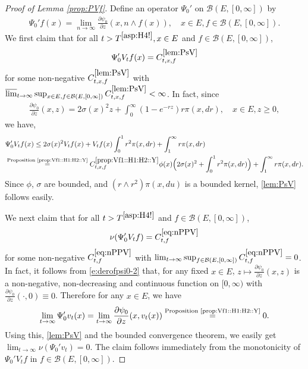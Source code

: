\documentclass[12pt,a4paper]{amsart}
\numberwithin{equation}{section}
\theoremstyle{plain}
\theoremstyle{definition}
\theoremstyle{remark}
\begin{document}
\begin{proof}[Proof of Lemma \ref{prop:PVf}]
	Define an operator $\Psi_0'$ on $\mathcal B(E,[0,\infty])$ by
	\begin{align}
	\Psi_0' f(x)
	= \lim_{n\to \infty}\frac{\partial \psi_0}{ \partial z} (x, n\wedge f(x)),
	\quad x\in E, f\in \mathcal B(E,[0,\infty]).
	\end{align}
	We first claim that for all $t> T^{\eqref{asp:H4!}}, x\in E$ and $f\in \mathcal B(E,[0,\infty])$,
\begin{equation}
	\Psi_0'V_tf(x) = C^{\eqref{lem:PsV}}_{t,x,f} \label{lem:PsV}
\end{equation}
	for some non-negative $C^{\eqref{lem:PsV}}_{t,x,f}$ with $\varlimsup_{t\to \infty} \sup_{x\in E, f\in \mathcal B(E, [0,\infty])} C^{\eqref{lem:PsV}}_{t,x,f} <\infty$.
	In fact, since
\begin{align}\label{e:derofpsi0-2}
	\frac{\partial \psi_0 }{ \partial z} (x,z)
	= 2\sigma (x)^2 z + \int_0^\infty (1 - e^{- rz}) r \pi(x,dr),
	\quad x\in E, z\geq 0,
\end{align}
	we have,
\begin{align}
	&\Psi_0' V_tf(x)
	\leq 2\sigma (x)^2 V_t f(x) + V_t f(x) \int_0^1 r^2 \pi(x,dr) + \int_1^\infty r \pi(x,dr)
	\\&\overset{\text{Proposition \ref{prop:Vf1::H1:H2::Y}}}= C^{\ref{prop:Vf1::H1:H2::Y}}_{t,x,f} \phi(x) \Big(2\sigma (x)^2 +\int_0^1 r^2 \pi(x,dr) \Big)+ \int_1^\infty r \pi(x,dr).
\end{align}
	Since $\phi$, $\sigma$ are bounded,  and $(r\wedge r^2)\pi(x,du)$ is a bounded kernel, \eqref{lem:PsV} follows easily.
	
	We next claim that for all $t > T^{\eqref{asp:H4!}}$ and $f\in \mathcal B(E,[0,\infty])$,
\begin{equation}
	\nu(\Psi_0' V_t f) = C^{\eqref{eq:nPPV}}_{t,f} \label{eq:nPPV}
\end{equation}
	for some non-negative $C^{\eqref{eq:nPPV}}_{t,f}$ with $\lim_{t\to \infty}\sup_{f\in \mathcal B(E, [0,\infty])} C^{\eqref{eq:nPPV}}_{t,f} = 0$.
	In fact, it follows from \eqref{e:derofpsi0-2} that, for any fixed $x\in E$, $z\mapsto \frac{\partial \psi_0}{\partial z} (x,z)$ is a non-negative, non-decreasing and continuous function on $[0,\infty)$ with $\frac{\partial \psi_0}{\partial z} (\cdot,0) \equiv 0$.
	Therefore for any $x\in E$, we have
\[
	\lim_{t\to \infty} \Psi_0' v_t(x) =\lim_{t\to \infty} \frac{\partial \psi_0}{ \partial z}(x,v_t(x)) \overset{\text{Proposition \ref{prop:Vf1::H1:H2::Y}}}{=} 0.
\]
	Using this, \eqref{lem:PsV} and the bounded convergence theorem, we easily get $\lim_{t\to \infty}\nu(\Psi_0' v_t)  = 0. $ The claim follows immediately from the monotonicity of $\Psi_0' V_t f$ in $f\in \mathcal B(E,[0,\infty])$.
	

\end{proof}
\end{document}
